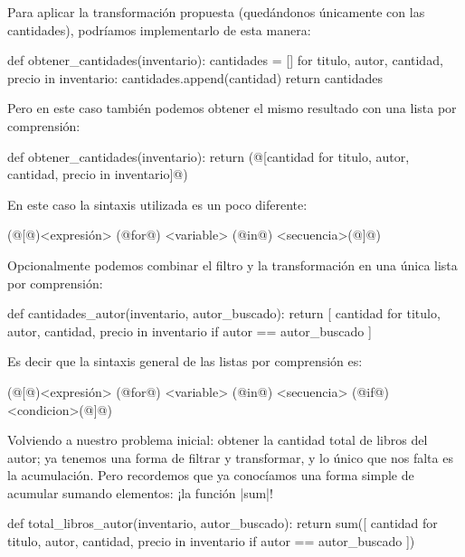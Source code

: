 \begin{subappendices}
Para aplicar la transformación propuesta (quedándonos únicamente con las
cantidades), podríamos implementarlo de esta manera:

\begin{codigo-python-sn}
def obtener_cantidades(inventario):
    cantidades = []
    for titulo, autor, cantidad, precio in inventario:
        cantidades.append(cantidad)
    return cantidades
\end{codigo-python-sn}

Pero en este caso también podemos obtener el mismo resultado con una lista por
comprensión:

\begin{codigo-python-sn}
def obtener_cantidades(inventario):
    return (@[cantidad for titulo, autor, cantidad, precio in inventario]@)
\end{codigo-python-sn}

En este caso la sintaxis utilizada es un poco diferente:

\begin{codigo-python-sn}
(@[@)<expresión> (@for@) <variable> (@in@) <secuencia>(@]@)
\end{codigo-python-sn}

Opcionalmente podemos combinar el filtro y la transformación en una única lista
por comprensión:

\begin{codigo-python-sn}
def cantidades_autor(inventario, autor_buscado):
    return [
        cantidad
        for titulo, autor, cantidad, precio in inventario
        if autor == autor_buscado
    ]
\end{codigo-python-sn}

\begin{observacion}
Es decir que la sintaxis general de las listas por comprensión es:
\begin{codigo-python-sn}
(@[@)<expresión> (@for@) <variable> (@in@) <secuencia> (@if@) <condicion>(@]@)
\end{codigo-python-sn}
\end{observacion}

Volviendo a nuestro problema inicial: obtener la cantidad total de libros del
autor; ya tenemos una forma de filtrar y transformar, y lo único que nos falta
es la acumulación. Pero recordemos que ya conocíamos una forma simple de
acumular sumando elementos: ¡la función |sum|!

\begin{codigo-python-sn}
def total_libros_autor(inventario, autor_buscado):
    return sum([
        cantidad
        for titulo, autor, cantidad, precio in inventario
        if autor == autor_buscado
    ])
\end{codigo-python-sn}


\end{subappendices}
